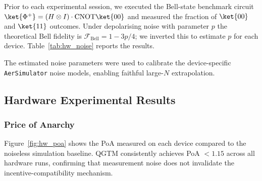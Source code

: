 Prior to each experimental session, we executed the Bell-state benchmark
circuit $\ket{\Phi^+} = (H \otimes I) \cdot \text{CNOT} \ket{00}$ and
measured the fraction of $\ket{00}$ and $\ket{11}$ outcomes.  Under
depolarising noise with parameter $p$ the theoretical Bell fidelity is
$\mathcal{F}_{\text{Bell}} = 1 - 3p/4$; we inverted this to estimate $p$ for
each device.  Table~\ref{tab:hw_noise} reports the results.

\begin{table}[!t]
\centering
\caption{Hardware Noise Characterisation via Bell-State Benchmark}
\label{tab:hw_noise}
\renewcommand{\arraystretch}{1.35}
\end{table}

\noindent The estimated noise parameters were used to calibrate the
device-specific \texttt{AerSimulator} noise models, enabling faithful large-$N$
extrapolation.

\subsection{Hardware Experimental Results}
\label{subsec:hw_results}

\subsubsection{Price of Anarchy}

Figure~\ref{fig:hw_poa} shows the PoA measured on each device compared to the
noiseless simulation baseline. QGTM consistently achieves PoA $< 1.15$ across
all hardware runs, confirming that measurement noise does not invalidate the
incentive-compatibility mechanism.

